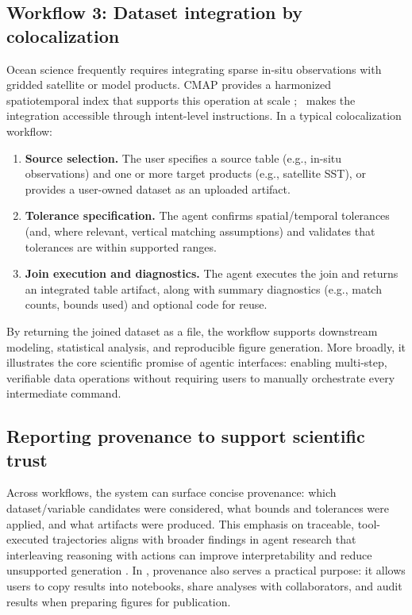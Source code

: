 \subsection{Workflow 3: Dataset integration by colocalization}
Ocean science frequently requires integrating sparse in-situ observations with gridded satellite or model products.
CMAP provides a harmonized spatiotemporal index that supports this operation at scale \citep{Ashkezari2021SimonsCMAP}; \cmapagent\ makes the integration accessible through intent-level instructions.
In a typical colocalization workflow:
\begin{enumerate}[leftmargin=*]
  \item \textbf{Source selection.} The user specifies a source table (e.g., in-situ observations) and one or more target products (e.g., satellite SST), or provides a user-owned dataset as an uploaded artifact.
  \item \textbf{Tolerance specification.} The agent confirms spatial/temporal tolerances (and, where relevant, vertical matching assumptions) and validates that tolerances are within supported ranges.
  \item \textbf{Join execution and diagnostics.} The agent executes the join and returns an integrated table artifact, along with summary diagnostics (e.g., match counts, bounds used) and optional code for reuse.
\end{enumerate}
By returning the joined dataset as a file, the workflow supports downstream modeling, statistical analysis, and reproducible figure generation.
More broadly, it illustrates the core scientific promise of agentic interfaces: enabling multi-step, verifiable data operations without requiring users to manually orchestrate every intermediate command.

\subsection{Reporting provenance to support scientific trust}
Across workflows, the system can surface concise provenance: which dataset/variable candidates were considered, what bounds and tolerances were applied, and what artifacts were produced.
This emphasis on traceable, tool-executed trajectories aligns with broader findings in agent research that interleaving reasoning with actions can improve interpretability and reduce unsupported generation \citep{Yao2022ReAct}.
In \cmapagent, provenance also serves a practical purpose: it allows users to copy results into notebooks, share analyses with collaborators, and audit results when preparing figures for publication.


